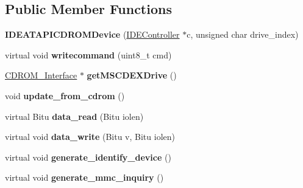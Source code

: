 \subsection*{Public Member Functions}
\begin{DoxyCompactItemize}
\item 
\hypertarget{classIDEATAPICDROMDevice_a39ac7bc2a7fae2783047b35ef977d517}{{\bfseries I\-D\-E\-A\-T\-A\-P\-I\-C\-D\-R\-O\-M\-Device} (\hyperlink{classIDEController}{I\-D\-E\-Controller} $\ast$c, unsigned char drive\-\_\-index)}\label{classIDEATAPICDROMDevice_a39ac7bc2a7fae2783047b35ef977d517}

\item 
\hypertarget{classIDEATAPICDROMDevice_a51df8590bd667e361f4af5c699f3b06e}{virtual void {\bfseries writecommand} (uint8\-\_\-t cmd)}\label{classIDEATAPICDROMDevice_a51df8590bd667e361f4af5c699f3b06e}

\item 
\hypertarget{classIDEATAPICDROMDevice_a9370dcd464a37c206ac4104d76125d83}{\hyperlink{classCDROM__Interface}{C\-D\-R\-O\-M\-\_\-\-Interface} $\ast$ {\bfseries get\-M\-S\-C\-D\-E\-X\-Drive} ()}\label{classIDEATAPICDROMDevice_a9370dcd464a37c206ac4104d76125d83}

\item 
\hypertarget{classIDEATAPICDROMDevice_aaf0363b5130f74e33dc7f8454d537980}{void {\bfseries update\-\_\-from\-\_\-cdrom} ()}\label{classIDEATAPICDROMDevice_aaf0363b5130f74e33dc7f8454d537980}

\item 
\hypertarget{classIDEATAPICDROMDevice_a058887aaf3444d5672590439ad454a34}{virtual Bitu {\bfseries data\-\_\-read} (Bitu iolen)}\label{classIDEATAPICDROMDevice_a058887aaf3444d5672590439ad454a34}

\item 
\hypertarget{classIDEATAPICDROMDevice_af03a9d36704d216f7f5ec1e02c71fb87}{virtual void {\bfseries data\-\_\-write} (Bitu v, Bitu iolen)}\label{classIDEATAPICDROMDevice_af03a9d36704d216f7f5ec1e02c71fb87}

\item 
\hypertarget{classIDEATAPICDROMDevice_ac90ac17eaf24d2339da72f344dc5a692}{virtual void {\bfseries generate\-\_\-identify\-\_\-device} ()}\label{classIDEATAPICDROMDevice_ac90ac17eaf24d2339da72f344dc5a692}

\item 
\hypertarget{classIDEATAPICDROMDevice_a47dac9860692eb7d9b0f115563d483f2}{virtual void {\bfseries generate\-\_\-mmc\-\_\-inquiry} ()}\label{classIDEATAPICDROMDevice_a47dac9860692eb7d9b0f115563d483f2}


\end{DoxyCompactItemize}
